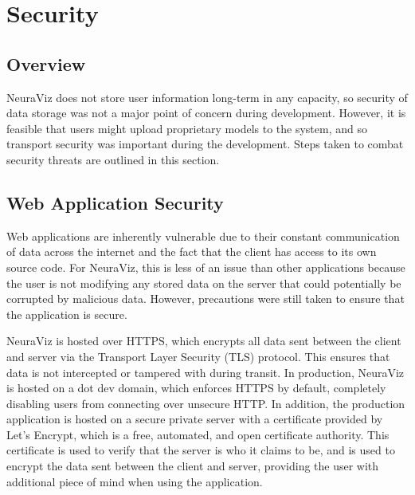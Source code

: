 \section{Security}																	
\label{sec:Security}

\subsection{Overview} 
NeuraViz does not store user information long-term in any capacity, so security of data storage was not a major point of concern during development. However, it is feasible that users might upload proprietary models to the system, and so transport security was important during the development. Steps taken to combat security threats are outlined in this section.

\subsection{Web Application Security}
Web applications are inherently vulnerable due to their constant communication of data across the internet and the fact that the client has access to its own source code. For NeuraViz, this is less of an issue than other applications because the user is not modifying any stored data on the server that could potentially be corrupted by malicious data. However, precautions were still taken to ensure that the application is secure.

NeuraViz is hosted over HTTPS, which encrypts all data sent between the client and server via the Transport Layer Security (TLS) protocol. This ensures that data is not intercepted or tampered with during transit. In production, NeuraViz is hosted on a dot dev domain, which enforces HTTPS by default, completely disabling users from connecting over unsecure HTTP. In addition, the production application is hosted on a secure private server with a certificate provided by Let's Encrypt, which is a free, automated, and open certificate authority. This certificate is used to verify that the server is who it claims to be, and is used to encrypt the data sent between the client and server, providing the user with additional piece of mind when using the application.

